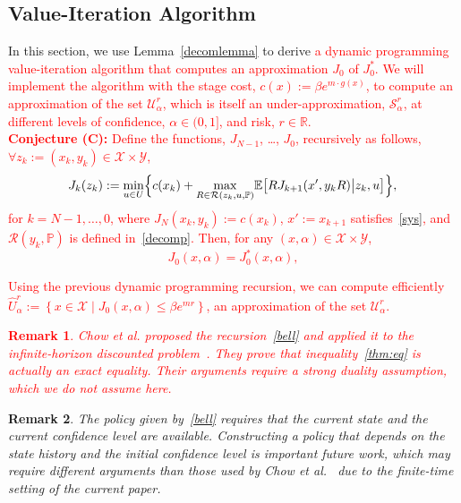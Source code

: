 \documentclass[letterpaper, 10 pt, conference]{ieeeconf}  %
\newtheorem{remark}{Remark}
\begin{document}
\subsection{Value-Iteration Algorithm}
In this section, we use Lemma~\ref{decomlemma} to derive \textcolor{red}{a dynamic programming value-iteration algorithm that computes an approximation $J_0$ of $J_0^*$.
We will implement the algorithm with the stage cost, $c(x) := \beta e^{m \cdot g(x)}$, 
to compute an approximation of the set $\mathcal{U}_\alpha^r$, which is itself an under-approximation, $\mathcal{S}_\alpha^r$, 
at different levels of confidence, $\alpha \in (0, 1]$, and risk, $r \in \mathbb{R}$.}\\
%
\textcolor{red}{
\textbf{Conjecture (C):}
Define the functions, $J_{N-1}$, \dots, $J_0$, recursively as follows, $\forall z_k := (x_k, y_k) \in \mathcal{X} \times \mathcal{Y}$,
\begin{equation}
J_k(z_k) := {\underset{u \in U}\min} \Big\{ c(x_k) + {\underset{R \in \mathcal{R}(z_k, u, \mathbb{P})}\max} \mathbb{E}\big[ R J_{k+1}(x', y_k R) \big| z_k, u \big] \Big\}, \\
\label{bell}\end{equation}
for $k = N-1, \dots, 0$, where $J_N(x_k, y_k) := c(x_k)$, $x' := x_{k+1}$ satisfies~\eqref{sys}, and $\mathcal{R}(y_k, \mathbb{P})$ is defined in~\eqref{decomp}.  
Then, for any $(x, \alpha) \in \mathcal{X} \times \mathcal{Y}$,
\begin{equation}
\label{thm:eq}
J_0(x,\alpha) = J_0^*(x, \alpha),
\end{equation}
}
%
\textcolor{red}{
Using the previous dynamic programming recursion, we can compute efficiently $\widehat{U}_{\alpha}^r := \left\{ x \in \mathcal{X} \mid J_0(x, \alpha) \leq \beta e^{m r}\right\}$, an approximation of the set $\mathcal{U}_{\alpha}^r$.\\
%
\begin{remark}
Chow et al. proposed the recursion~\eqref{bell} and applied it to the infinite-horizon discounted problem~\cite{chow2015risk}. They prove that inequality~\eqref{thm:eq} is actually an exact equality. Their arguments require a strong duality assumption, which we do not assume here.
\end{remark}
}
%
\begin{remark}
The policy given by~\eqref{bell} requires that the current state and the current confidence level are available.
Constructing a policy that depends on the state history and the initial confidence level is important future work,
which may require different arguments than those used by Chow et al.~\cite{chow2015risk} due to the finite-time setting of the current paper.  %
\end{remark} 
\end{document}
